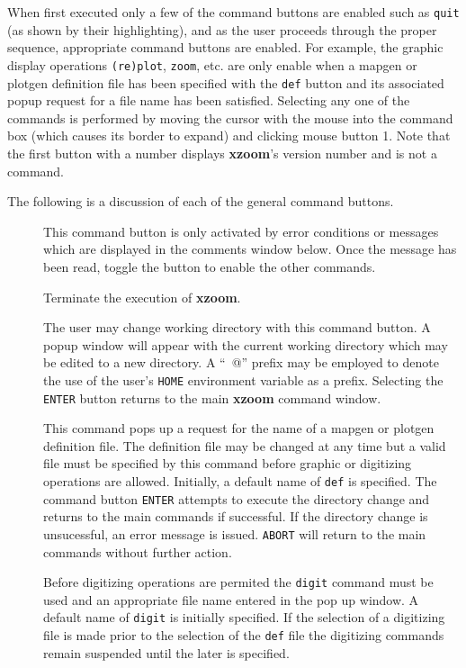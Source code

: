 When first executed only a few of the command buttons are enabled
such as {\tt quit} (as shown by their highlighting),
and as the user proceeds through
the proper sequence, appropriate command buttons are enabled.
For example, the graphic display operations {\tt (re)plot},
{\tt zoom}, etc.
are only enable when a {\sc mapgen} or {\sc plotgen} definition
file has been specified with the {\tt def} button and its
associated popup request for a file name has been satisfied.
Selecting any one of the commands is performed by moving the
cursor with the mouse into the command box (which causes its border to expand)
and clicking mouse button 1.
Note that the first button with a number displays {\bf xzoom}'s
version number and is not a command.

The following is a discussion of each of the general command buttons.
\begin{description}
\item[]
This command button is only activated by error conditions or messages
which are displayed in the comments window below.
Once the message has been read, toggle the button to enable
the other commands.
\item[]
Terminate the execution of {\bf xzoom}.
\item[]
The user may change working directory with this command button.
A popup window will appear with the current working directory
which may be edited to a new directory.
A ``\verb@~@'' prefix may be employed to denote the use of
the user's {\tt HOME} environment variable as a prefix.
Selecting the {\tt ENTER} button returns to the main
{\bf xzoom} command window.
\item[]
This command pops up a request for the name of a {\sc mapgen}
or {\sc plotgen} definition file.
The definition file may be changed at any time but a valid
file must be specified by this command
before graphic or digitizing operations are allowed.
Initially, a default name of {\tt def} is specified.
The command button {\tt ENTER} attempts to execute the
directory change and returns to the main commands if successful.
If the directory change is unsucessful, an error message
is issued.
{\tt ABORT} will return to the main commands without further
action.
\item[]
Before digitizing operations are permited the {\tt digit}
command must be used and an appropriate file name
entered in the pop up window.
A default name of {\tt digit} is initially specified.
If the selection of a digitizing file is made prior to
the selection of the {\tt def} file the digitizing commands
remain suspended until the later is specified.


\end{description}
